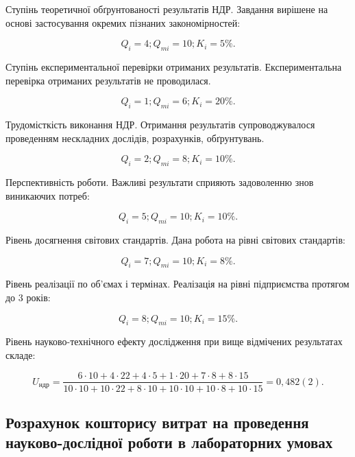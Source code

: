 Ступінь теоретичної обґрунтованості результатів НДР. Завдання вирішене на основі застосування окремих пізнаних закономірностей:

\begin{equation}
Q_i = 4; Q_{mi} = 10; K_i = 5\%. \nonumber
\end{equation}

Ступінь експериментальної перевірки отриманих результатів. Експериментальна перевірка отриманих результатів не проводилася.

\begin{equation}
Q_i = 1; Q_{mi} = 6; K_i = 20\%. \nonumber
\end{equation}

Трудомісткість виконання НДР. Отримання результатів супроводжувалося проведенням нескладних дослідів, розрахунків, обґрунтувань.

\begin{equation}
Q_i = 2; Q_{mi} = 8; K_i = 10\%. \nonumber
\end{equation}

Перспективність роботи. Важливі результати сприяють задоволенню знов виникаючих потреб:

\begin{equation}
Q_i = 5; Q_{mi} = 10; K_i = 10\%. \nonumber
\end{equation}

Рівень досягнення світових стандартів. Дана робота на рівні світових стандартів:

\begin{equation}
Q_i = 7; Q_{mi} = 10; K_i = 8\%. \nonumber
\end{equation}

Рівень реалізації по об'ємах і термінах. Реалізація на рівні підприємства протягом до 3 років:

\begin{equation}
Q_i = 8; Q_{mi} = 10; K_i = 15\%. \nonumber
\end{equation}

Рівень науково-технічного ефекту дослідження при вище відмічених результатах складе:

\begin{equation}
U_{\text{ндр}} = \frac{6  \cdot  10+4  \cdot  22+4  \cdot  5+1  \cdot  20+7  \cdot  8+8  \cdot  15}{10  \cdot  10+10  \cdot  22+8  \cdot  10+10  \cdot  10+10  \cdot  8+10  \cdot  15} = 0,482(2). \nonumber
\end{equation}
    \subsection{Розрахунок кошторису витрат на проведення науково-дослідної роботи в лабораторних умовах}

